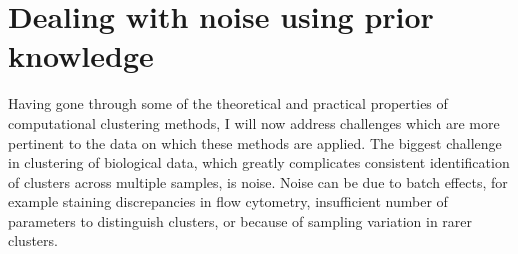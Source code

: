 
\section{Dealing with noise using prior knowledge}

Having gone through some of the theoretical and practical properties of computational clustering methods, I will now address challenges which are more pertinent to the data on which these methods are applied.
The biggest challenge in clustering of biological data, which greatly complicates consistent identification of clusters across multiple samples, is noise.
Noise can be due to batch effects, for example staining discrepancies in flow cytometry, insufficient number of parameters to distinguish clusters, or because of sampling variation in rarer clusters.

